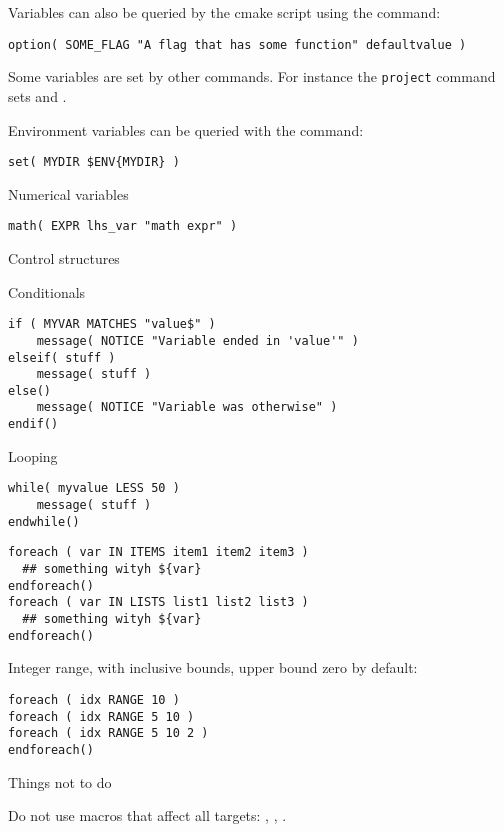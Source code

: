 Variables can also be queried by the cmake script using the  command:
\begin{lstlisting}
option( SOME_FLAG "A flag that has some function" defaultvalue )
\end{lstlisting}

Some variables are set by other commands.
For instance the \texttt{project} command sets
 and .

Environment variables can be queried with the  command:
\begin{lstlisting}
set( MYDIR $ENV{MYDIR} )
\end{lstlisting}

 {Numerical variables}

\begin{lstlisting}
math( EXPR lhs_var "math expr" )
\end{lstlisting}

 {Control structures}

 {Conditionals}

\begin{lstlisting}
if ( MYVAR MATCHES "value$" )
    message( NOTICE "Variable ended in 'value'" )
elseif( stuff )
    message( stuff )
else()
    message( NOTICE "Variable was otherwise" )
endif()
\end{lstlisting}

 {Looping}

\begin{lstlisting}
while( myvalue LESS 50 )
    message( stuff )
endwhile()
\end{lstlisting}

\begin{lstlisting}
foreach ( var IN ITEMS item1 item2 item3 )
  ## something wityh ${var}
endforeach()
foreach ( var IN LISTS list1 list2 list3 )
  ## something wityh ${var}
endforeach()
\end{lstlisting}

Integer range, with inclusive bounds, upper bound zero by default:
\begin{lstlisting}
foreach ( idx RANGE 10 )
foreach ( idx RANGE 5 10 )
foreach ( idx RANGE 5 10 2 )
endforeach()
\end{lstlisting}

 {Things not to do}

Do not use macros that affect all targets: ,
, .

